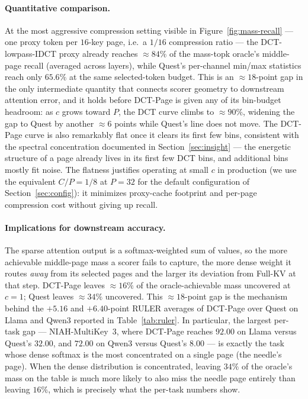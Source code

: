 \paragraph{Quantitative comparison.}
At the most aggressive compression setting visible in
Figure~\ref{fig:mass-recall} --- one proxy token per $16$-key page,
i.e.\ a $1/16$ compression ratio --- the DCT-lowpass-IDCT proxy
already reaches $\approx 84\%$ of the mass-topk oracle's
middle-page recall (averaged across layers), while Quest's
per-channel min/max statistics reach only $65.6\%$ at the same
selected-token budget.  This is an $\approx 18$-point gap in the
only intermediate quantity that connects scorer geometry to
downstream attention error, and it holds before DCT-Page is given
any of its bin-budget headroom: as $c$ grows toward $P$, the DCT
curve climbs to $\approx 90\%$, widening the gap to Quest by another
$\approx 6$ points while Quest's line does not move.  The DCT-Page curve is also remarkably flat once it
clears its first few bins, consistent with the spectral concentration
documented in Section~\ref{sec:insight} --- the energetic structure
of a page already lives in its first few DCT bins, and additional
bins mostly fit noise.  The flatness justifies operating at small $c$
in production (we use the equivalent $C/P = 1/8$ at $P{=}32$ for the
default configuration of Section~\ref{sec:config}): it minimizes
proxy-cache footprint and per-page compression cost without giving up
recall.

\paragraph{Implications for downstream accuracy.}
The sparse attention output is a softmax-weighted sum of values, so
the more achievable middle-page mass a scorer fails to capture, the
more dense weight it routes \emph{away} from its selected pages and
the larger its deviation from Full-KV at that step.  DCT-Page leaves
$\approx 16\%$ of the oracle-achievable mass uncovered at $c{=}1$;
Quest leaves $\approx 34\%$ uncovered.  This $\approx 18$-point gap
is the mechanism behind the $+5.16$ and $+6.40$-point RULER averages
of DCT-Page over Quest on Llama and Qwen3 reported in
Table~\ref{tab:ruler}.  In particular, the largest per-task gap ---
NIAH-MultiKey~3, where DCT-Page reaches $92.00$ on Llama versus
Quest's $32.00$, and $72.00$ on Qwen3 versus Quest's $8.00$ --- is
exactly the task whose dense softmax is the most concentrated on a
single page (the needle's page).  When the dense distribution is
concentrated, leaving $34\%$ of the oracle's mass on the table is
much more likely to also miss the needle page entirely than leaving
$16\%$, which is precisely what the per-task numbers show.


